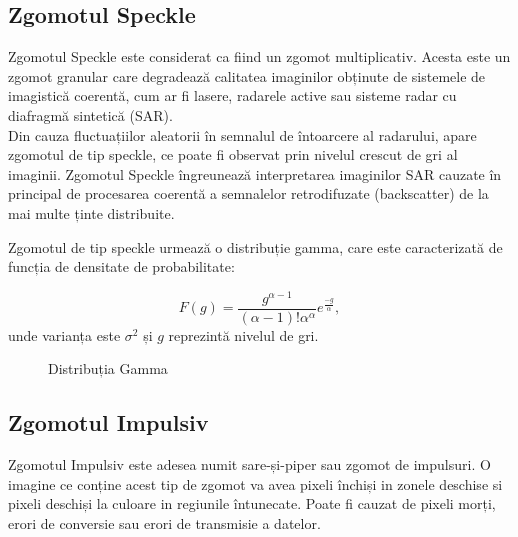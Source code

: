 \documentclass[12pt]{article}
\begin{document}
\subsection{Zgomotul Speckle}
Zgomotul Speckle este considerat ca fiind un zgomot multiplicativ. Acesta este un zgomot granular care degradează calitatea imaginilor obținute de sistemele de imagistică coerentă, cum ar fi lasere, radarele active sau sisteme radar cu diafragmă sintetică (SAR). \\
\indent Din cauza fluctuațiilor aleatorii în semnalul de întoarcere al radarului, apare zgomotul de tip speckle, ce poate fi observat prin nivelul crescut de gri al imaginii. Zgomotul Speckle îngreunează interpretarea imaginilor SAR cauzate în principal de procesarea coerentă a semnalelor retrodifuzate (backscatter) de la mai multe ținte distribuite.

Zgomotul de tip speckle urmează o distribuție gamma, care este caracterizată de funcția de densitate de probabilitate:

\begin{equation}
F(g) = \frac{g^{\alpha-1}}{(\alpha-1)! \alpha^{\alpha}} e^{\frac{-g}{\alpha}},
\end{equation}
unde varianța este ${\sigma^2}$ și ${g}$ reprezintă nivelul de gri. \\

\begin{figure}[h]
  \centering
  \caption{Distribuția Gamma}
  \label{fig:gamma_distribution}
\end{figure}



\subsection{Zgomotul Impulsiv}
Zgomotul Impulsiv este adesea numit sare-și-piper sau zgomot de impulsuri. O imagine ce conține acest tip de zgomot va avea pixeli închiși in zonele deschise si pixeli deschiși la culoare in regiunile întunecate. Poate fi cauzat de pixeli morți, erori de conversie sau erori de transmisie a datelor. 
\newpage
\end{document}
